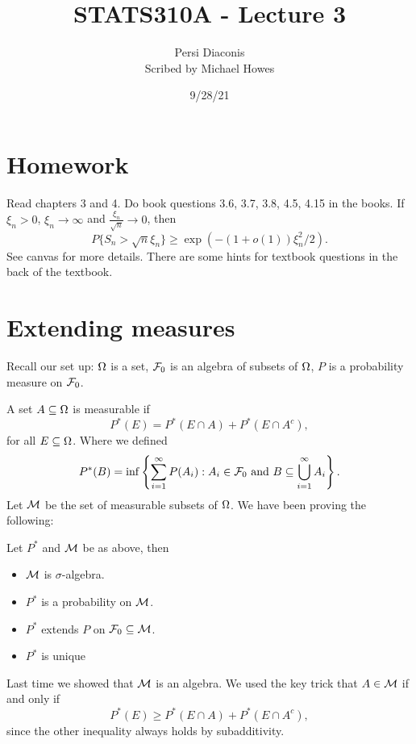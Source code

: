 




\title{STATS310A - Lecture 3}
\author{Persi Diaconis\\ Scribed by Michael Howes}
\date{9/28/21}

\pagestyle{fancy}
\fancyhf{}



\maketitle
\tableofcontents
\section{Homework}
Read chapters 3 and 4.
Do book questions 3.6, 3.7, 3.8, 4.5, 4.15 in the books.
If $\xi_n > 0$, $\xi_n \to \infty$ and $\frac{\xi_n}{\sqrt{n}} \to 0$, then 
\[P\{S_n > \sqrt{n}\xi_n\} \ge \exp(-(1+o(1))\xi_n^2/2). \]
See canvas for more details. There are some hints for textbook questions in the back of the textbook.

\section{Extending measures}
Recall our set up: ${{\Omega}}$ is a set, ${\mathcal{F}}_0$ is an algebra of subsets of ${{\Omega}}$, $P$ is a probability measure on ${\mathcal{F}}_0$.

A set $A \subseteq {{\Omega}}$ is measurable if
\[P^*(E) = P^*(E \cap A) + P^*(E \cap A^c), \]
for all $E \subseteq {{\Omega}}$. Where we defined
\[P^*(B) = \inf\left\{\sum_{i=1}^\infty P(A_i) : A_i \in {\mathcal{F}}_0 \text{ and } B \subseteq \bigcup_{i=1}^\infty A_i\right\}. \]
Let ${\mathcal{M}}$ be the set of measurable subsets of ${{\Omega}}$. We have been proving the following:
\begin{thrm}
    Let $P^*$ and ${\mathcal{M}}$ be as above, then
    \begin{itemize}
        \item ${\mathcal{M}}$ is $\sigma$-algebra.
        \item $P^*$ is a probability on ${\mathcal{M}}$.
        \item $P^*$ extends $P$ on ${\mathcal{F}}_0 \subseteq {\mathcal{M}}$.
        \item $P^*$ is unique
    \end{itemize}
\end{thrm}
Last time we showed that ${\mathcal{M}}$ is an algebra. We used the key trick that $A \in {\mathcal{M}}$ if and only if
\[P^*(E) \ge P^*(E \cap A) + P^*(E \cap A^c), \]
since the other inequality always holds by subadditivity.

